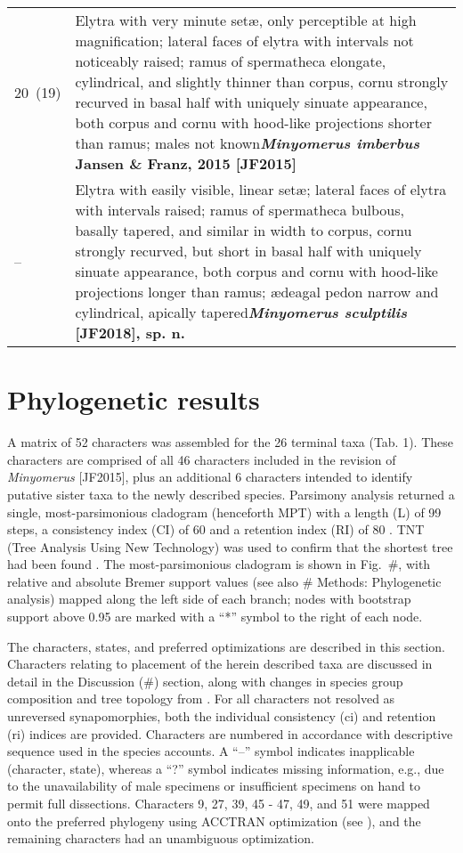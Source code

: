 \documentclass[fleqn,10pt,lineno]{wlpeerj} %
\newcommand{\breakfill}{\dotfill\newline\penalty0\hbox{}\nobreak\dotfill}
\begin{document}
\begin{xtabular}{@{}
                p{\dimexpr.1\textwidth-\tabcolsep\relax}
                p{\dimexpr.9\textwidth-\tabcolsep\relax}@{}}
		{20~(19)} & {Elytra with very minute set{\ae}, only perceptible at high magnification; lateral faces of elytra with intervals not noticeably raised; ramus of spermatheca elongate, cylindrical, and slightly thinner than corpus, cornu strongly recurved in basal half with uniquely sinuate appearance, both corpus and cornu with hood-like projections shorter than ramus; males not known}{\breakfill}{\textbf{\textit{Minyomerus imberbus} Jansen \& Franz, 2015 [JF2015]}}\\
		{--} & {Elytra with easily visible, linear set{\ae}; lateral faces of elytra with intervals raised; ramus of spermatheca bulbous, basally tapered, and similar in width to corpus, cornu strongly recurved, but short in basal half with uniquely sinuate appearance, both corpus and cornu with hood-like projections longer than ramus; {\ae}deagal pedon narrow and cylindrical, apically tapered}{\breakfill}{\textbf{\textit{Minyomerus sculptilis} [JF2018], sp. n.}}\\
	\end{xtabular}
	
\section*{Phylogenetic results}
	A matrix of 52 characters was assembled for the 26 terminal taxa (Tab. 1).
	These characters are comprised of all 46 characters included in the revision of \textit{Minyomerus} [JF2015], plus an additional 6 characters intended to identify putative sister taxa to the newly described species.
	Parsimony analysis returned a single, most-parsimonious cladogram (henceforth MPT) with a length (L) of 99 steps, a consistency index (CI) of 60 and a retention index (RI) of 80 \citep{farris1989}.
	TNT (Tree Analysis Using New Technology) was used to confirm that the shortest tree had been found \citep{goloboff2008}.
	The most-parsimonious cladogram is shown in Fig.~\#, with relative and absolute Bremer support values (see also \# Methods: Phylogenetic analysis) mapped along the left side of each branch; nodes with bootstrap support above 0.95 are marked with a ``*'' symbol to the right of each node.
	
	The characters, states, and preferred optimizations are described in this section.
	Characters relating to placement of the herein described taxa are discussed in detail in the Discussion (\#) section, along with changes in species group composition and tree topology from \citet{jansen2015}.
	 For all characters not resolved as unreversed synapomorphies, both the individual consistency (ci) and retention (ri) indices are provided.
	Characters are numbered in accordance with descriptive sequence used in the species accounts.
	A ``–'' symbol indicates inapplicable (character, state), whereas a ``?'' symbol indicates missing information, e.g., due to the unavailability of male specimens or insufficient specimens on hand to permit full dissections.
	Characters 9, 27, 39, 45 - 47, 49, and 51 were mapped onto the preferred phylogeny using ACCTRAN optimization (see \citealt{agnarsson2008}), and the remaining characters had an unambiguous optimization.
	
\end{document}
